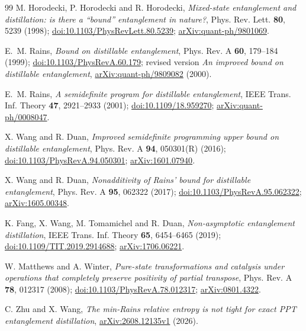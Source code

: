 \documentclass[11pt,a4paper]{article}
\theoremstyle{definition}
\theoremstyle{plain}
\begin{document}
\begingroup\small
\begin{thebibliography}{99}
\setlength{\itemsep}{2pt}
M. Horodecki, P. Horodecki and R. Horodecki,
\emph{Mixed-state entanglement and distillation: is there a ``bound''
entanglement in nature?},
Phys. Rev. Lett. \textbf{80}, 5239 (1998);
\href{https://doi.org/10.1103/PhysRevLett.80.5239}{doi:10.1103/PhysRevLett.80.5239};
\href{https://arxiv.org/abs/quant-ph/9801069}{arXiv:quant-ph/9801069}.

E.~M. Rains,
\emph{Bound on distillable entanglement},
Phys. Rev. A \textbf{60}, 179--184 (1999);
\href{https://doi.org/10.1103/PhysRevA.60.179}{doi:10.1103/PhysRevA.60.179};
revised version \emph{An improved bound on distillable entanglement},
\href{https://arxiv.org/abs/quant-ph/9809082}{arXiv:quant-ph/9809082} (2000).

E.~M. Rains,
\emph{A semidefinite program for distillable entanglement},
IEEE Trans. Inf. Theory \textbf{47}, 2921--2933 (2001);
\href{https://doi.org/10.1109/18.959270}{doi:10.1109/18.959270};
\href{https://arxiv.org/abs/quant-ph/0008047}{arXiv:quant-ph/0008047}.

X. Wang and R. Duan,
\emph{Improved semidefinite programming upper bound on distillable
entanglement},
Phys. Rev. A \textbf{94}, 050301(R) (2016);
\href{https://doi.org/10.1103/PhysRevA.94.050301}{doi:10.1103/PhysRevA.94.050301};
\href{https://arxiv.org/abs/1601.07940}{arXiv:1601.07940}.

X. Wang and R. Duan,
\emph{Nonadditivity of Rains' bound for distillable entanglement},
Phys. Rev. A \textbf{95}, 062322 (2017);
\href{https://doi.org/10.1103/PhysRevA.95.062322}{doi:10.1103/PhysRevA.95.062322};
\href{https://arxiv.org/abs/1605.00348}{arXiv:1605.00348}.

K. Fang, X. Wang, M. Tomamichel and R. Duan,
\emph{Non-asymptotic entanglement distillation},
IEEE Trans. Inf. Theory \textbf{65}, 6454--6465 (2019);
\href{https://doi.org/10.1109/TIT.2019.2914688}{doi:10.1109/TIT.2019.2914688};
\href{https://arxiv.org/abs/1706.06221}{arXiv:1706.06221}.

W. Matthews and A. Winter,
\emph{Pure-state transformations and catalysis under operations that
completely preserve positivity of partial transpose},
Phys. Rev. A \textbf{78}, 012317 (2008);
\href{https://doi.org/10.1103/PhysRevA.78.012317}{doi:10.1103/PhysRevA.78.012317};
\href{https://arxiv.org/abs/0801.4322}{arXiv:0801.4322}.

C. Zhu and X. Wang,
\emph{The min-Rains relative entropy is not tight for exact PPT entanglement
distillation},
\href{https://arxiv.org/abs/2608.12135}{arXiv:2608.12135v1} (2026).
\end{thebibliography}
\endgroup
\end{document}
